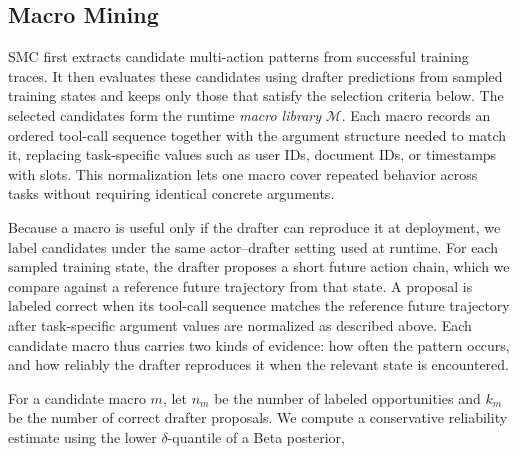 \subsection{Macro Mining}

SMC first extracts candidate multi-action patterns from successful training traces.
It then evaluates these candidates using drafter predictions from sampled training states and keeps only those that satisfy the selection criteria below.
The selected candidates form the runtime \emph{macro library} $\mathcal{M}$.
Each macro records an ordered tool-call sequence together with the argument structure needed to match it, replacing task-specific values such as user IDs, document IDs, or timestamps with slots. 
This normalization lets one macro cover repeated behavior across tasks without requiring identical concrete arguments.


Because a macro is useful only if the drafter can reproduce it at deployment, we label candidates under the same actor--drafter setting used at runtime. 
For each sampled training state, the drafter proposes a short future action chain, which we compare against a reference future trajectory from that state. 
A proposal is labeled correct when its tool-call sequence matches the reference future trajectory after task-specific argument values are normalized as described above.
Each candidate macro thus carries two kinds of evidence: how often the pattern occurs, and how reliably the drafter reproduces it when the relevant state is encountered.


For a candidate macro $m$, let $n_m$ be the number of labeled opportunities and $k_m$ be the number of correct drafter proposals. 
We compute a conservative reliability estimate using the lower $\delta$-quantile of a Beta posterior,

